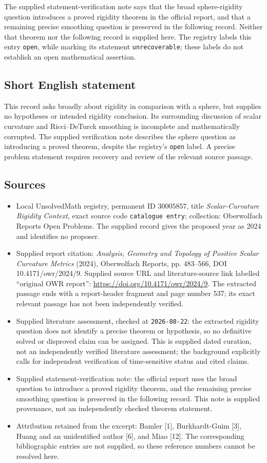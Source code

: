 \documentclass[11pt]{article}
\begin{document}
The supplied statement-verification note says that the broad sphere-rigidity question introduces a proved rigidity theorem in the official report, and that a remaining precise smoothing question is preserved in the following record. Neither that theorem nor the following record is supplied here. The registry labels this entry \texttt{open}, while marking its statement \texttt{unrecoverable}; these labels do not establish an open mathematical assertion.
\subsection{Short English statement}
This record asks broadly about rigidity in comparison with a sphere, but supplies no hypotheses or intended rigidity conclusion. Its surrounding discussion of scalar curvature and Ricci--DeTurck smoothing is incomplete and mathematically corrupted. The supplied verification note describes the sphere question as introducing a proved theorem, despite the registry's \texttt{open} label. A precise problem statement requires recovery and review of the relevant source passage.
\subsection{Sources}
\begin{itemize}
\item Local UnsolvedMath registry, permanent ID \(30005857\), title \emph{Scalar-Curvature Rigidity Context}, exact source code \texttt{catalogue entry}; collection: Oberwolfach Reports Open Problems. The supplied record gives the proposed year as 2024 and identifies no proposer.
\item Supplied report citation: \emph{Analysis, Geometry and Topology of Positive Scalar Curvature Metrics} (2024), Oberwolfach Reports, pp. 483--566, DOI 10.4171/owr/2024/9. Supplied source URL and literature-source link labelled ``original OWR report'': \url{https://doi.org/10.4171/owr/2024/9}. The extracted passage ends with a report-header fragment and page number 537; its exact relevant passage has not been independently verified.
\item Supplied literature assessment, checked at \texttt{2026-08-22}: the extracted rigidity question does not identify a precise theorem or hypothesis, so no definitive solved or disproved claim can be assigned. This is supplied dated curation, not an independently verified literature assessment; the background explicitly calls for independent verification of time-sensitive status and cited claims.
\item Supplied statement-verification note: the official report uses the broad question to introduce a proved rigidity theorem, and the remaining precise smoothing question is preserved in the following record. This note is supplied provenance, not an independently checked theorem statement.
\item Attribution retained from the excerpt: Bamler [1], Burkhardt-Guim [3], Huang and an unidentified author [6], and Miao [12]. The corresponding bibliographic entries are not supplied, so these reference numbers cannot be resolved here.
\end{itemize}
\end{document}
